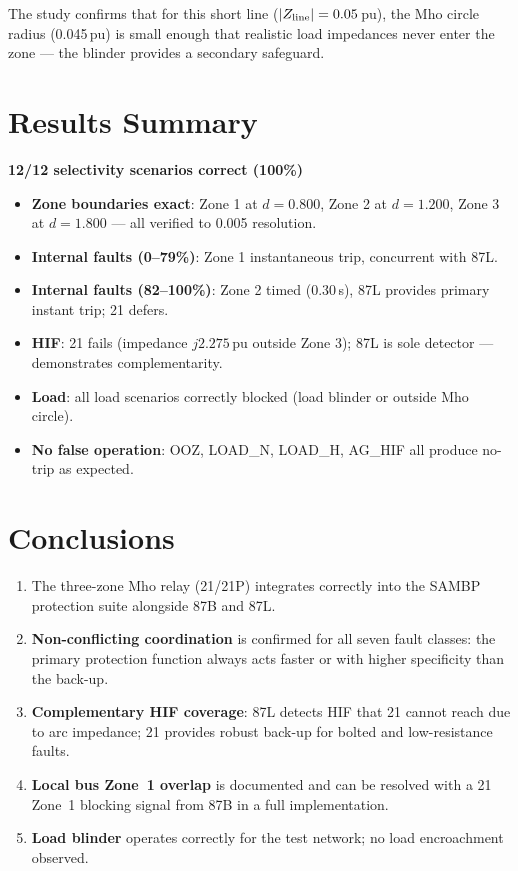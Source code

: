 \documentclass[11pt, a4paper]{article}
\begin{document}
The study confirms that for this short line ($|Z_{\rm line}|=0.05$\,pu),
the Mho circle radius (0.045\,pu) is small enough that realistic load
impedances never enter the zone — the blinder provides a secondary safeguard.


\section{Results Summary}
\label{sec:results}

\begin{center}
\Large
\textbf{\textcolor{okgreen}{12/12 selectivity scenarios correct (100\%)}}
\end{center}

\begin{itemize}
  \item \textbf{Zone boundaries exact}: Zone 1 at $d=0.800$, Zone 2 at
        $d=1.200$, Zone 3 at $d=1.800$ — all verified to 0.005 resolution.
  \item \textbf{Internal faults (0--79\%)}: Zone 1 instantaneous trip,
        concurrent with 87L.
  \item \textbf{Internal faults (82--100\%)}: Zone 2 timed (0.30\,s),
        87L provides primary instant trip; 21 defers.
  \item \textbf{HIF}: 21 fails (impedance $j2.275$\,pu outside Zone 3);
        87L is sole detector — demonstrates complementarity.
  \item \textbf{Load}: all load scenarios correctly blocked (load blinder
        or outside Mho circle).
  \item \textbf{No false operation}: OOZ, LOAD\_N, LOAD\_H, AG\_HIF all
        produce no-trip as expected.
\end{itemize}


\section{Conclusions}
\label{sec:conclusions}

\begin{enumerate}
  \item The three-zone Mho relay (21/21P) integrates correctly into the
        SAMBP protection suite alongside 87B and 87L.
  \item \textbf{Non-conflicting coordination} is confirmed for all seven
        fault classes: the primary protection function always acts faster
        or with higher specificity than the back-up.
  \item \textbf{Complementary HIF coverage}: 87L detects HIF that 21 cannot
        reach due to arc impedance; 21 provides robust back-up for bolted and
        low-resistance faults.
  \item \textbf{Local bus Zone~1 overlap} is documented and can be resolved
        with a 21 Zone~1 blocking signal from 87B in a full implementation.
  \item \textbf{Load blinder} operates correctly for the test network;
        no load encroachment observed.
\end{enumerate}
\end{document}
